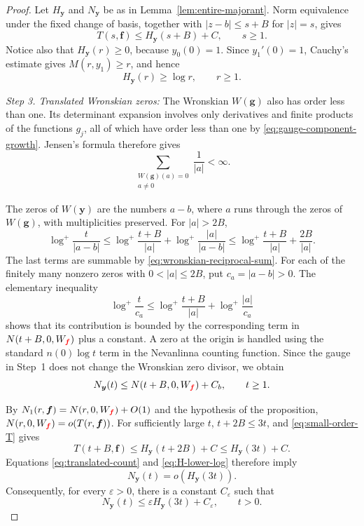 \documentclass[12pt,letterpaper,reqno]{amsart}
\theoremstyle{definition}
\numberwithin{equation}{section}
\newcommand{\fv}{\bm f}
\newcommand{\gv}{\bm g}
\newcommand{\yv}{\bm y}
\newcommand{\revision}[1]{\textcolor{red}{#1}}
\begin{document}
\begin{proof}
Let \(H_{\yv}\) and \(N_{\yv}\) be as in
Lemma~\ref{lem:entire-majorant}. Norm equivalence under the fixed
change of basis, together with
\(|z-b|\leq s+B\) for \(|z|=s\), gives
\begin{equation}\label{eq:small-order-T}
 T(s,\fv)
 \leq
 H_{\yv}(s+B)+C,
 \qquad
 s\geq1.
\end{equation}
Notice also that \(H_{\yv}(r)\geq0\), because \(y_0(0)=1\). Since
\(y_1'(0)=1\), Cauchy's estimate gives \(M(r,y_1)\geq r\), and hence
\begin{equation}\label{eq:H-lower-log}
 H_{\yv}(r)\geq\log r,
 \qquad
 r\geq1.
\end{equation}


\medskip\noindent
\emph{{Step 3. Translated Wronskian zeros:}}
The Wronskian \(W(\gv)\) also has order less than one. Its determinant
expansion involves only derivatives and finite products of the functions
\(g_j\), all of which have order less than one by
\eqref{eq:gauge-component-growth}. Jensen's formula therefore gives
\begin{equation}\label{eq:wronskian-reciprocal-sum}
 \sum_{\substack{W(\gv)(a)=0\\ a\ne0}}
 \frac1{|a|}
 <\infty.
\end{equation}


The zeros of \(W(\yv)\) are the numbers \(a-b\), where \(a\) runs
through the zeros of \(W(\gv)\), with multiplicities preserved.
For \(|a|>2B\),
\[
 \log^+\frac{t}{|a-b|}
 \leq
 \log^+\frac{t+B}{|a|}
 +
 \log^+\frac{|a|}{|a-b|}
 \leq
 \log^+\frac{t+B}{|a|}+\frac{2B}{|a|}.
\]
The last terms are summable by
\eqref{eq:wronskian-reciprocal-sum}. For each of the finitely many nonzero zeros with
\(0<|a|\leq2B\), put \(c_a=|a-b|>0\). The elementary inequality
\[
 \log^+\frac{t}{c_a}
 \leq
 \log^+\frac{t+B}{|a|}
 +\log^+\frac{|a|}{c_a}
\]
shows that its contribution is bounded by the corresponding term in
\(N(t+B,0,W_{\revision{\fv}})\) plus a constant. A zero at the origin is
handled using the standard \(n(0)\log t\) term in the Nevanlinna
counting function. Since the gauge in Step~1
does not change the Wronskian zero divisor, we obtain
\begin{equation}\label{eq:translated-count}
 N_{\yv}(t)
 \leq
 N(t+B,0,W_{\revision{\fv}})+C_b,
 \qquad
 t\geq1.
\end{equation}

By \(N_1(r,\fv)=N(r,0,W_{\revision{\fv}})+O(1)\) and the hypothesis of the
proposition,
\(N(r,0,W_{\revision{\fv}})=o(T(r,\fv))\). For sufficiently large \(t\),
\(t+2B\leq3t\), and \eqref{eq:small-order-T} gives
\[
 T(t+B,\fv)
 \leq
 H_{\yv}(t+2B)+C
 \leq
 H_{\yv}(3t)+C.
\]
Equations \eqref{eq:translated-count} and \eqref{eq:H-lower-log}
therefore imply
\[
 N_{\yv}(t)
 =
 o(H_{\yv}(3t)).
\]
Consequently, for every \(\varepsilon>0\), there is a constant
\(C_\varepsilon\) such that
\begin{equation}\label{eq:small-order-divisor-majorant}
 N_{\yv}(t)
 \leq
 \varepsilon H_{\yv}(3t)+C_\varepsilon,
 \qquad
 t>0.
\end{equation}



\end{proof}
\end{document}
